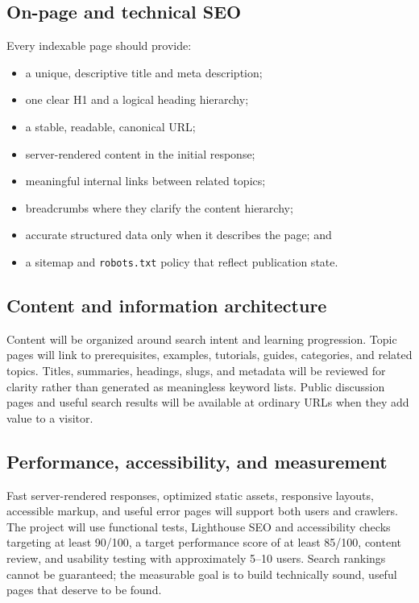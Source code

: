 \documentclass[11pt,a4paper]{article}
\begin{document}
\subsection{On-page and technical SEO}

Every indexable page should provide:

\begin{itemize}
  \item a unique, descriptive title and meta description;
  \item one clear H1 and a logical heading hierarchy;
  \item a stable, readable, canonical URL;
  \item server-rendered content in the initial response;
  \item meaningful internal links between related topics;
  \item breadcrumbs where they clarify the content hierarchy;
  \item accurate structured data only when it describes the page; and
  \item a sitemap and \texttt{robots.txt} policy that reflect publication state.
\end{itemize}

\subsection{Content and information architecture}

Content will be organized around search intent and learning progression. Topic
pages will link to prerequisites, examples, tutorials, guides, categories, and
related topics. Titles, summaries, headings, slugs, and metadata will be reviewed
for clarity rather than generated as meaningless keyword lists. Public discussion
pages and useful search results will be available at ordinary URLs when they add
value to a visitor.

\subsection{Performance, accessibility, and measurement}

Fast server-rendered responses, optimized static assets, responsive layouts,
accessible markup, and useful error pages will support both users and crawlers.
The project will use functional tests, Lighthouse SEO and accessibility checks
targeting at least 90/100, a target performance score of at least 85/100,
content review, and usability testing with approximately 5--10 users. Search
rankings cannot be guaranteed; the measurable goal is to build technically sound,
useful pages that deserve to be found.
\end{document}
